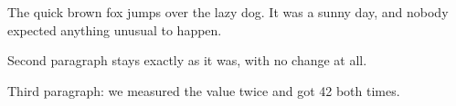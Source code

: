 \documentclass{article}
\begin{document}
The quick brown fox jumps over the lazy dog. It was a sunny day,
and nobody expected anything unusual to happen.

Second paragraph stays exactly as it was, with no change at all.

Third paragraph: we measured the value twice and got 42 both times.
\end{document}
